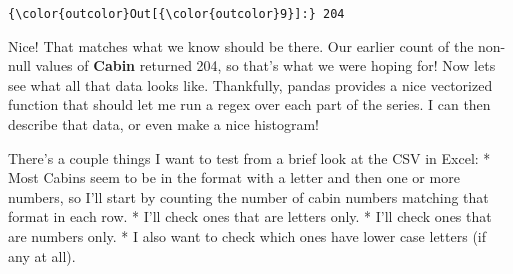 \documentclass[11pt]{article}
\begin{document}
\begin{Verbatim}[commandchars=\\\{\}]
{\color{outcolor}Out[{\color{outcolor}9}]:} 204
\end{Verbatim}
            
    Nice! That matches what we know should be there. Our earlier count of
the non-null values of \textbf{Cabin} returned 204, so that's what we
were hoping for! Now lets see what all that data looks like. Thankfully,
pandas provides a nice vectorized function that should let me run a
regex over each part of the series. I can then describe that data, or
even make a nice histogram!

There's a couple things I want to test from a brief look at the CSV in
Excel: * Most Cabins seem to be in the format with a letter and then one
or more numbers, so I'll start by counting the number of cabin numbers
matching that format in each row. * I'll check ones that are letters
only. * I'll check ones that are numbers only. * I also want to check
which ones have lower case letters (if any at all).
\end{document}
